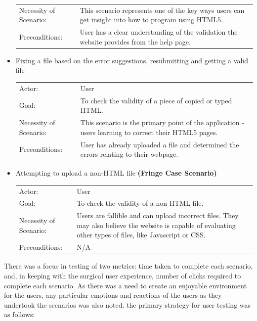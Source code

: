 \documentclass[10pt]{article}
\begin{document}
\begin{itemize}
\begin{tabular}{l p{3.5in}}
Necessity of Scenario: & This scenario represents one of the key ways users can get insight into how to program using HTML5. \\
Preconditions: & User has a clear understanding of the validation the website provides from the help page. \\
\end{tabular}
\item Fixing a file based on the error suggestions, resubmitting and getting a valid file \\
\begin{tabular}{l p{3.5in}}
Actor: & User \\
Goal: & To check the validity of a piece of copied or typed HTML. \\
Necessity of Scenario: & This scenario is the primary point of the application - users learning to correct their HTML5 pages. \\
Preconditions: & User has already uploaded a file and determined the errors relating to their webpage. \\
\end{tabular}
\item Attempting to upload a non-HTML file \textbf{(Fringe Case Scenario)} \\
\begin{tabular}{l p{3.5in}}
Actor: & User \\
Goal: & To check the validity of a non-HTML file. \\
Necessity of Scenario: & Users are fallible and can upload incorrect files. They may also believe the website is capable of evaluating other types of files, like Javascript or CSS. \\
Preconditions: & N/A \\
\end{tabular}
\end{itemize}

There was a focus in testing of two metrics: time taken to complete each scenario, and, in keeping with the surgical user experience, number of clicks required to complete each scenario. As there was a need to create an enjoyable environment for the users, any particular emotions and reactions of the users as they undertook the scenarios was also noted. the primary strategy for user testing was as follows:
\end{document}
